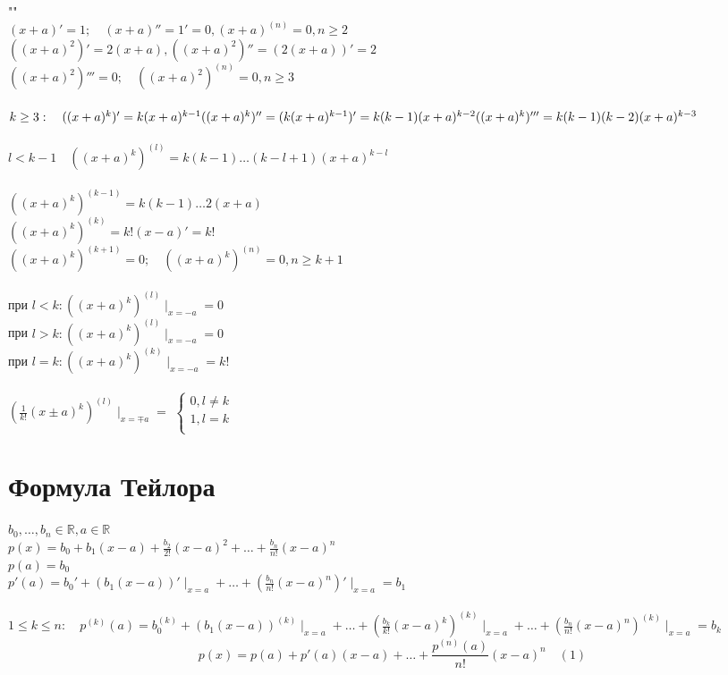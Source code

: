 \begin{properties} ""\\
	$(x+a)'=1; \quad (x+a)''=1'=0, (x+a)^{(n)}=0, n\ge 2$ \\
		$((x+a)^2)'=2(x+a), ((x+a)^2)''=(2(x+a))'=2$ \\
		$((x+a)^2)'''=0; \quad  ((x+a)^2)^{(n)}=0, n\ge 3$ \\
		\\
		$k\ge 3: \quad ((x+a)^{k})'=k(x+a)^{k-1}\\((x+a)^{k})''=(k(x+a)^{k-1})'=k(k-1)(x+a)^{k-2}\\ ((x+a)^{k})'''=k(k-1)(k-2)(x+a)^{k-3}$ \\
		\\
		$l<k-1 \quad ((x+a)^{k})^{(l)}=k(k-1)\ldots(k-l+1)(x+a)^{k-l}$ \\
		\\
		$((x+a)^{k})^{(k-1)}=k(k-1)\ldots 2(x+a)$ \\
		$((x+a)^{k})^{(k)}=k!(x-a)'=k!$ \\
		$((x+a)^{k})^{(k+1)}=0; \quad ((x+a)^{k})^{(n)}=0, n\ge k+1$\\
		\\
		при $l<k: ((x+a)^{k})^{(l)}\mid_{x=-a}=0$ \\
		при $l>k: ((x+a)^{k})^{(l)}\mid_{x=-a}=0$ \\
		при $l=k: ((x+a)^{k})^{(k)}\mid_{x=-a}=k!$ \\
		\\
		$(\displaystyle\frac{1}{k!}(x\pm a)^{k})^{(l)}\mid_{x=\mp a}=$ 
		$\begin{cases}
			0, l \neq k\\
			1, l = k\\
		\end{cases}$\\
\end{properties}


\section{Формула Тейлора}
\begin{definition}
	$b_0, \ldots, b_n \in \mathbb{R}, a \in \mathbb{R}$\\
	$p(x)=b_0+b_1(x-a)+\displaystyle\frac{b_2}{2!}(x-a)^2+\ldots+\displaystyle\frac{b_n}{n!}(x-a)^{n}$ \\
	$p(a)=b_0$ \\
	$p'(a)=b_0'+(b_1(x-a))'\mid_{x=a}+\ldots+(\displaystyle\frac{b_n}{n!}(x-a)^{n})'\mid_{x=a}=b_1$ \\
	\\
	$1\le k\le n: \quad p^{(k)}(a)=b_0^{(k)}+(b_1(x-a))^{(k)}\mid_{x=a}+\ldots+(\displaystyle\frac{b_k}{k!}(x-a)^{k})^{(k)}\mid_{x=a}+\ldots+(\displaystyle\frac{b_n}{n!}(x-a)^{n})^{(k)}\mid_{x=a}=b_k$
	\[
	p(x)=p(a)+p'(a)(x-a)+\ldots+\displaystyle\frac{p^{(n)}(a)}{n!}(x-a)^{n} \quad (1)
	\]
\end{definition}



